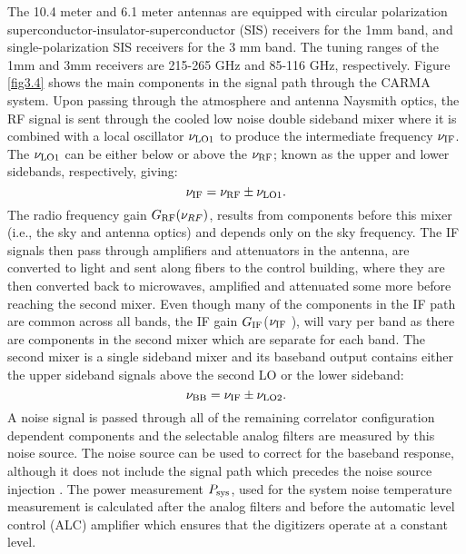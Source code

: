 The 10.4 meter and 6.1 meter antennas are equipped with circular polarization  superconductor-insulator-superconductor (SIS) receivers \citep{engargiola_2004} for the 1mm band, and single-polarization SIS receivers for the 3 mm band. The tuning ranges of the 1mm and 3mm receivers are 215-265 GHz and 85-116 GHz, respectively. Figure \ref{fig3.4} shows the main components in the signal path through the CARMA system. Upon passing through the atmosphere and antenna Naysmith optics, the RF signal is sent through the cooled low noise double sideband mixer where it is combined with a local oscillator $\nu _{\rm{LO1}}$ to produce the intermediate frequency $\nu _{\rm{IF}}$. The $\nu _{\rm{LO1}}$ can be either below or above the $\nu _{\rm{RF}}$; known as the upper and lower sidebands, respectively, giving:
\begin{equation}
\nu _{\rm{IF}}=\nu _{\rm{RF}}\pm \nu _{\rm{LO1}}.
\end{equation}
The radio frequency gain $G_{\rm{RF}}(\nu _{RF})$, results from components before this mixer (i.e., the sky and antenna optics) and depends only on the sky frequency. The IF signals then pass through amplifiers and attenuators in the antenna, are converted to light and sent along fibers to the control building, where they are then converted back to microwaves, amplified and attenuated some more before reaching the second mixer. Even though many of the components in the IF path are common across all bands, the IF gain $G_{\rm{IF}}$($\nu _{\rm{IF}}$ ), will vary per band as there are components in the second mixer which are separate for each band. The second mixer is a single sideband mixer and its baseband output contains either the upper sideband signals above the second LO or the lower sideband:
\begin{equation}
\nu _{\rm{BB}} = \nu _{\rm{IF}} \pm \nu _{\rm{LO2}}.
\end{equation}
A noise signal is passed through all of the remaining correlator configuration dependent components and the selectable analog filters are measured by this noise source. The noise source can be used to correct for the baseband response, although it does not include the signal path which precedes the noise source injection \citep{wright_2009}. The power measurement $P_{\rm{sys}}$, used for the system noise temperature measurement is calculated after the analog filters and before the automatic level control (ALC) amplifier which ensures that the digitizers operate at a constant level.


